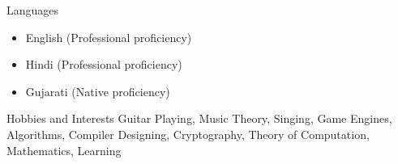 \documentclass{resume}
\begin{document}
\begin{rSection}{Languages}
\begin{itemize}
    \item English (Professional proficiency)
    \item Hindi (Professional proficiency)
    \item Gujarati (Native proficiency)
\end{itemize}
\end{rSection}

\begin{rSection}{Hobbies and Interests}
Guitar Playing, Music Theory, Singing, Game Engines, Algorithms, Compiler Designing, Cryptography, Theory of Computation, Mathematics, Learning
\end{rSection}
\end{document}
